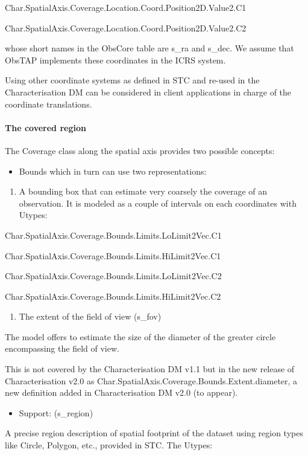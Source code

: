 \documentclass[11pt,a4paper]{ivoa}
\begin{document}
Char.SpatialAxis.Coverage.Location.Coord.Position2D.Value2.C1

Char.SpatialAxis.Coverage.Location.Coord.Position2D.Value2.C2

whose short names in the ObsCore table are s\_ra and s\_dec. We assume that ObsTAP implements these coordinates in the
ICRS system. 

Using other coordinate systems as defined in STC \citep{2009ivoa.rept.1030R} and re-used in the Characterisation DM can be
considered in client applications in charge of the coordinate translations.

\paragraph{The covered region}
The Coverage class along the spatial axis provides two possible concepts:

\begin{itemize}
\item Bounds which in turn can use two representations:
\end{itemize}
\begin{enumerate}
\item A bounding box that can estimate very coarsely the coverage of an observation.  It is modeled as a couple of
intervals on each coordinates with Utypes:
\end{enumerate}
Char.SpatialAxis.Coverage.Bounds.Limits.LoLimit2Vec.C1

Char.SpatialAxis.Coverage.Bounds.Limits.HiLimit2Vec.C1

Char.SpatialAxis.Coverage.Bounds.Limits.LoLimit2Vec.C2

Char.SpatialAxis.Coverage.Bounds.Limits.HiLimit2Vec.C2

\begin{enumerate}
\item The extent of the field of view (s\_fov) 
\end{enumerate}
The model offers to estimate the size of the diameter of the greater circle encompassing the field of view.

This is not covered by the Characterisation DM v1.1 but in the new release of Characterisation v2.0 as
Char.SpatialAxis.Coverage.Bounds.Extent.diameter, a new definition added in Characterisation DM v2.0 (to appear).

\begin{itemize}
\item Support: (s\_region)
\end{itemize}
A precise region description of spatial footprint of the dataset using region types like Circle, Polygon, etc., provided
in STC.  The Utypes:
\end{document}
